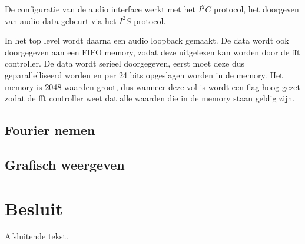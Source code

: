 \documentclass[a4paper,kul]{kulakarticle} %
\begin{document}
De configuratie van de audio interface werkt met het $I^2C$ protocol, het doorgeven van audio data gebeurt via het $I^2S$ protocol.\newline

In het top level wordt daarna een audio loopback gemaakt. De data wordt ook doorgegeven aan een FIFO memory, zodat deze uitgelezen kan worden door de fft controller. De data wordt serieel doorgegeven, eerst moet deze dus geparallelliseerd worden en per 24 bits opgeslagen worden in de memory. Het memory is 2048 waarden groot, dus wanneer deze vol is wordt een flag hoog gezet zodat de fft controller weet dat alle waarden die in de memory staan geldig zijn. 

\subsection{Fourier nemen}

\subsection{Grafisch weergeven}

\section{Besluit}

Afsluitende tekst.
\end{document}

